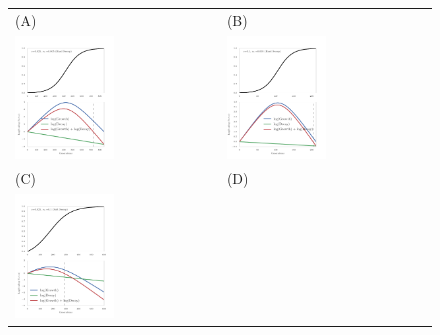\begin{figure}[H]
	\centering
	\begin{tabular}{l|l}
		(A)&(B)\\
		\includegraphics[width=0.5\textwidth]{figures/decayFactors0}
		&\includegraphics[width=0.5\textwidth]{figures/decayFactors1}\\
		\hline(C)&(D)\\
		\includegraphics[width=0.5\textwidth]{figures/decayFactors2}

\end{tabular}
\end{figure}
